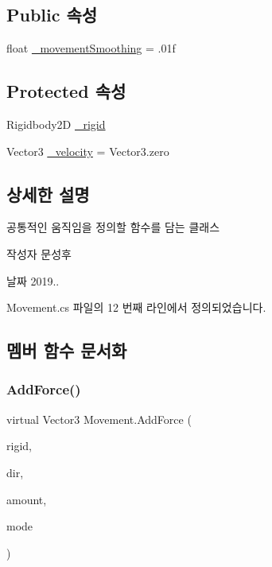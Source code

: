 \subsection*{Public 속성}
\begin{DoxyCompactItemize}
\item 
float \mbox{\hyperlink{class_movement_aff7ca49ff5d930ac7345da97a5162e3a}{\+\_\+movement\+Smoothing}} = .\+01f
\end{DoxyCompactItemize}
\subsection*{Protected 속성}
\begin{DoxyCompactItemize}
\item 
Rigidbody2D \mbox{\hyperlink{class_movement_a8b24a93b5f529e53c668ff81bde13c0d}{\+\_\+rigid}}
\item 
Vector3 \mbox{\hyperlink{class_movement_a6ea6768262f1dca968be8ee5c14a0cc1}{\+\_\+velocity}} = Vector3.\+zero
\end{DoxyCompactItemize}


\subsection{상세한 설명}
공통적인 움직임을 정의할 함수를 담는 클래스 

\begin{DoxyAuthor}{작성자}
문성후 
\end{DoxyAuthor}
\begin{DoxyDate}{날짜}
2019.. 
\end{DoxyDate}


Movement.\+cs 파일의 12 번째 라인에서 정의되었습니다.



\subsection{멤버 함수 문서화}
\mbox{\label{class_movement_ab0b20a2f058e2eed15f4bdf0503a2566}} 
\subsubsection{\texorpdfstring{AddForce()}{AddForce()}}
{\footnotesize\ttfamily virtual Vector3 Movement.\+Add\+Force (\begin{DoxyParamCaption}\item[{Rigidbody2D}]{rigid,  }\item[{Vector3}]{dir,  }\item[{float}]{amount,  }\item[{Force\+Mode2D}]{mode }\end{DoxyParamCaption})\hspace{0.3cm}{\ttfamily [virtual]}}



